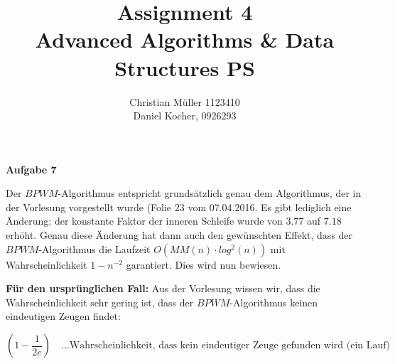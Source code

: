 \documentclass{article}
\begin{document}
\title{Assignment 4 \\ Advanced Algorithms \& Data Structures PS}%
\author{Christian Müller 1123410 \\ Daniel Kocher, 0926293}%
\maketitle

{\noindent\bfseries Aufgabe 7}%
\medskip%

\begin{algorithm}
%
\end{algorithm}

\noindent
Der $BPWM$-Algorithmus entspricht grunds{\"a}tzlich genau dem Algorithmus, der
in der Vorlesung vorgestellt wurde (Folie 23 vom 07.04.2016. Es gibt lediglich
eine {\"A}nderung: der konstante Faktor der inneren Schleife wurde von $3.77$ auf
$7.18$ erh{\"o}ht. Genau diese {\"A}nderung hat dann auch den gew{\"u}nschten
Effekt, dass der $BPWM$-Algorithmus die Laufzeit
$O \left( MM \left( n \right) \cdot log^2(n) \right)$ mit
Wahrscheinlichkeit $1 - n^{-2}$ garantiert. Dies wird nun bewiesen.

{\bfseries F{\"u}r den urspr{\"u}nglichen Fall:} \newline
Aus der Vorlesung wissen wir, dass die Wahrscheinlichkeit sehr gering ist, dass
der $BPWM$-Algorithmus keinen eindeutigen Zeugen findet:

\begin{equation}
  \left( 1 - \frac{1}{2e} \right) \quad \text{\ldots Wahrscheinlichkeit, dass
    kein eindeutiger Zeuge gefunden wird (ein Lauf)}
\end{equation}
\end{document}
